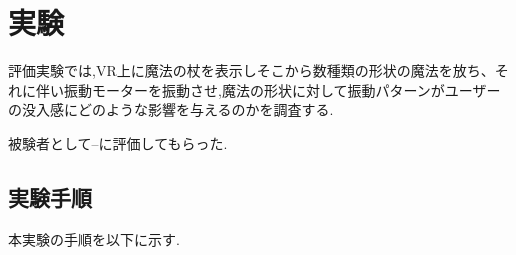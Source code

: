 \chapter{実験}

評価実験では,VR上に魔法の杖を表示しそこから数種類の形状の魔法を放ち、それに伴い振動モーターを振動させ,魔法の形状に対して振動パターンがユーザーの没入感にどのような影響を与えるのかを調査する.

被験者として--に評価してもらった.

\section{実験手順}
本実験の手順を以下に示す.





\begin{comment}
    \begin{textblock}{2}(1, 16.5)
        空行→
    \end{textblock}
    
    \begin{textblock}{2}(1, 18.5)
        字下げ→
    \end{textblock}
        
    \begin{textblock}{2}(1, 20.5)
        空行→
    \end{textblock}
    
    \begin{textblock}{11}(9, 20.5)
        ←読点までが元の文なので文献番号はその後につける
    \end{textblock}
    
    \begin{textblock}{7}(14, 26.5)
        ↑同じく読点までが元の文なので
    
        "」"と文献番号はその後につける
    \end{textblock}
\end{comment}




\begin{comment}
    \begin{textblock}{11}(9, 7.5)
        \noindent
        ↑間接引用では節末・文末の句読点の「前」に文献番号をつける
    \end{textblock}
\end{comment}




